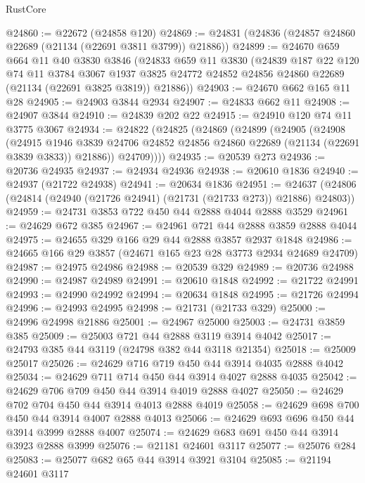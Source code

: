 \begin{lexlean}{RustCore}
\begin{coremodule}
@24860 := @22672 (@24858 @120)
@24869 := @24831 (@24836 (@24857 @24860 @22689 (@21134 (@22691 @3811 @3799)) @21886))
@24899 := @24670
    @659
    @664
    @11
    @40
    @3830
    @3846
    (@24833
      @659
      @11
      @3830
      (@24839
        @187
        @22
        @120
        @74
        @11
        @3784
        @3067
        @1937
        @3825
        @24772
        @24852
        @24856
        @24860
        @22689
        (@21134 (@22691 @3825 @3819))
        @21886))
@24903 := @24670 @662 @165 @11 @28
@24905 := @24903 @3844 @2934
@24907 := @24833 @662 @11
@24908 := @24907 @3844
@24910 := @24839 @202 @22
@24915 := @24910 @120 @74 @11 @3775 @3067
@24934 := @24822
    (@24825
      (@24869
        (@24899
          (@24905
            (@24908
              (@24915
                @1946
                @3839
                @24706
                @24852
                @24856
                @24860
                @22689
                (@21134 (@22691 @3839 @3833))
                @21886))
            @24709))))
@24935 := @20539 @273
@24936 := @20736 @24935
@24937 := @24934 @24936
@24938 := @20610 @1836
@24940 := @24937 (@21722 @24938)
@24941 := @20634 @1836
@24951 := @24637 (@24806 (@24814 (@24940 (@21726 @24941) (@21731 (@21733 @273)) @21886) @24803))
@24959 := @24731 @3853 @722 @450 @44 @2888 @4044 @2888 @3529
@24961 := @24629 @672 @385
@24967 := @24961 @721 @44 @2888 @3859 @2888 @4044
@24975 := @24655 @329 @166 @29 @44 @2888 @3857 @2937 @1848
@24986 := @24665 @166 @29 @3857 (@24671 @165 @23 @28 @3773 @2934 @24689 @24709)
@24987 := @24975 @24986
@24988 := @20539 @329
@24989 := @20736 @24988
@24990 := @24987 @24989
@24991 := @20610 @1848
@24992 := @21722 @24991
@24993 := @24990 @24992
@24994 := @20634 @1848
@24995 := @21726 @24994
@24996 := @24993 @24995
@24998 := @21731 (@21733 @329)
@25000 := @24996 @24998 @21886
@25001 := @24967 @25000
@25003 := @24731 @3859 @385
@25009 := @25003 @721 @44 @2888 @3119 @3914 @4042
@25017 := @24793 @385 @44 @3119 (@24798 @382 @44 @3118 @21354)
@25018 := @25009 @25017
@25026 := @24629 @716 @719 @450 @44 @3914 @4035 @2888 @4042
@25034 := @24629 @711 @714 @450 @44 @3914 @4027 @2888 @4035
@25042 := @24629 @706 @709 @450 @44 @3914 @4019 @2888 @4027
@25050 := @24629 @702 @704 @450 @44 @3914 @4013 @2888 @4019
@25058 := @24629 @698 @700 @450 @44 @3914 @4007 @2888 @4013
@25066 := @24629 @693 @696 @450 @44 @3914 @3999 @2888 @4007
@25074 := @24629 @683 @691 @450 @44 @3914 @3923 @2888 @3999
@25076 := @21181 @24601 @3117
@25077 := @25076 @284
@25083 := @25077 @682 @65 @44 @3914 @3921 @3104
@25085 := @21194 @24601 @3117

\end{coremodule}
\end{lexlean}
